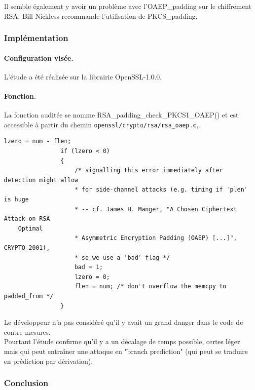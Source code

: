 			Il semble également y avoir un problème avec l'OAEP\_padding sur le chiffrement RSA. Bill Nickless recommande l'utilisation de PKCS\_padding. \cite{sourceforgeRSAbroken}	\\
		
		
		\subsubsection{Implémentation}
			
			\paragraph{Configuration visée.\\}
			
			L'étude a été réalisée sur la librairie OpenSSL-1.0.0.
			
			\paragraph{Fonction.\\}
			
			La fonction auditée se nomme RSA\_padding\_check\_PKCS1\_OAEP() et est accessible à partir du chemin \texttt{openssl/crypto/rsa/rsa\_oaep.c},.
		
		
			\begin{lstlisting}[style=customc,caption=rsa\_oaep.c,
			label=rsaoaep]
				lzero = num - flen;
				if (lzero < 0)
				{
					/* signalling this error immediately after detection might allow
					* for side-channel attacks (e.g. timing if 'plen' is huge
					* -- cf. James H. Manger, "A Chosen Ciphertext Attack on RSA
	Optimal
					* Asymmetric Encryption Padding (OAEP) [...]", CRYPTO 2001),
					* so we use a 'bad' flag */
					bad = 1;
					lzero = 0;
					flen = num; /* don't overflow the memcpy to padded_from */
				}
			\end{lstlisting}
		
			Le développeur n'a pas considéré qu'il y avait un grand danger dans le code de contre-mesures.\\
			Pourtant l'étude confirme qu'il y a un décalage de temps possible, certes léger mais qui peut entraîner une attaque en "branch prediction" (qui peut se traduire en prédiction par dérivation).\\
			
		\subsubsection{Conclusion}
		
